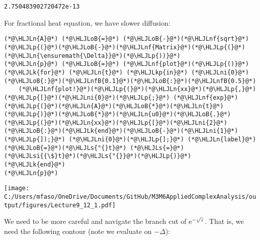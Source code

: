 \documentclass[12pt,a4paper]{article}
\newcommand{\HLJLk}[1]{\textcolor[RGB]{148,91,176}{\textbf{#1}}}
\newcommand{\HLJLkp}[1]{\textcolor[RGB]{148,91,176}{\textbf{#1}}}
\newcommand{\HLJLn}[1]{#1}
\newcommand{\HLJLnf}[1]{\textcolor[RGB]{66,102,213}{#1}}
\newcommand{\HLJLs}[1]{\textcolor[RGB]{201,61,57}{#1}}
\newcommand{\HLJLsi}[1]{#1}
\newcommand{\HLJLnfB}[1]{\textcolor[RGB]{59,151,46}{#1}}
\newcommand{\HLJLni}[1]{\textcolor[RGB]{59,151,46}{#1}}
\newcommand{\HLJLoB}[1]{\textcolor[RGB]{102,102,102}{\textbf{#1}}}
\newcommand{\HLJLp}[1]{#1}
\def\E{ {\rm e} }
\begin{document}
\begin{lstlisting}
2.750483902720472e-13
\end{lstlisting}


For fractional heat equation, we have slower diffusion:


\begin{lstlisting}
(*@\HLJLn{A}@*) (*@\HLJLoB{=}@*) (*@\HLJLoB{-}@*)(*@\HLJLnf{sqrt}@*)(*@\HLJLp{(}@*)(*@\HLJLoB{-}@*)(*@\HLJLnf{Matrix}@*)(*@\HLJLp{(}@*)(*@\HLJLn{\ensuremath{\Delta}}@*)(*@\HLJLp{))}@*)
(*@\HLJLn{p}@*) (*@\HLJLoB{=}@*) (*@\HLJLnf{plot}@*)(*@\HLJLp{()}@*)
(*@\HLJLk{for}@*) (*@\HLJLn{t}@*) (*@\HLJLkp{in}@*) (*@\HLJLni{0}@*)(*@\HLJLoB{:}@*)(*@\HLJLnfB{0.1}@*)(*@\HLJLoB{:}@*)(*@\HLJLnfB{0.5}@*)
    (*@\HLJLnf{plot!}@*)(*@\HLJLp{(}@*)(*@\HLJLn{xx}@*)(*@\HLJLp{,}@*) (*@\HLJLp{[}@*)(*@\HLJLni{0}@*)(*@\HLJLp{;}@*) (*@\HLJLnf{exp}@*)(*@\HLJLp{(}@*)(*@\HLJLn{A}@*)(*@\HLJLoB{*}@*)(*@\HLJLn{t}@*)(*@\HLJLp{)}@*)(*@\HLJLoB{*}@*)(*@\HLJLn{u0}@*)(*@\HLJLoB{.}@*)(*@\HLJLp{(}@*)(*@\HLJLn{xx}@*)(*@\HLJLp{[}@*)(*@\HLJLni{2}@*)(*@\HLJLoB{:}@*)(*@\HLJLk{end}@*)(*@\HLJLoB{-}@*)(*@\HLJLni{1}@*)(*@\HLJLp{]);}@*) (*@\HLJLni{0}@*)(*@\HLJLp{];}@*) (*@\HLJLn{label}@*)(*@\HLJLoB{=}@*)(*@\HLJLs{"{}t}@*) (*@\HLJLs{=}@*) (*@\HLJLsi{{\$}t}@*)(*@\HLJLs{"{}}@*)(*@\HLJLp{)}@*)
(*@\HLJLk{end}@*)
(*@\HLJLn{p}@*)
\end{lstlisting}

\texttt{[image: C:/Users/mfaso/OneDrive/Documents/GitHub/M3M6AppliedComplexAnalysis/output/figures/Lecture9\_12\_1.pdf]}

We need to be more careful and navigate the branch cut of $\E^{-\sqrt{z}}$. That is, we need the following contour (note we evaluate on $-\Delta$):
\end{document}
